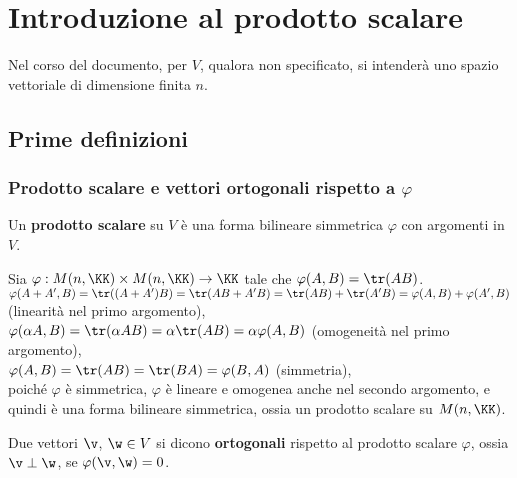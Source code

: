 \chapter{Introduzione al prodotto scalare}

\begin{note}
	Nel corso del documento, per $V$, qualora non specificato, si intenderà uno spazio vettoriale di dimensione
	finita $n$.
\end{note}

\section{Prime definizioni}

\subsection{Prodotto scalare e vettori ortogonali rispetto a \texorpdfstring{$\varphi$}{φ}}

\begin{definition} 
	Un \textbf{prodotto scalare} su $V$ è una forma bilineare simmetrica $\varphi$ con argomenti in $V$.
\end{definition}

\begin{example}
	Sia $\varphi : M(n, \KK) \times M(n, \KK) \to \KK$ tale che $\varphi(A, B) = \tr(AB)$. \\
	
	\li $\varphi(A + A', B) = \tr((A + A')B) = \tr(AB + A'B) = \tr(AB) + \tr(A'B) = \varphi(A, B) + \varphi(A', B)$ (linearità
	nel primo argomento), \\
	\li $\varphi(\alpha A, B) = \tr(\alpha A B) = \alpha \tr(AB) = \alpha \varphi(A, B)$ (omogeneità nel primo argomento), \\
	\li $\varphi(A, B) = \tr(AB) = \tr(BA) = \varphi(B, A)$ (simmetria), \\
	\li poiché $\varphi$ è simmetrica, $\varphi$ è lineare e omogenea anche nel secondo argomento, e quindi è una
	forma bilineare simmetrica, ossia un prodotto scalare su $M(n, \KK)$.
\end{example}

\begin{definition} 
	Due vettori $\v$, $\w \in V$ si dicono \textbf{ortogonali} rispetto al prodotto scalare $\varphi$, ossia $\v \perp \w$, se $\varphi(\v, \w) = 0$.
\end{definition}

